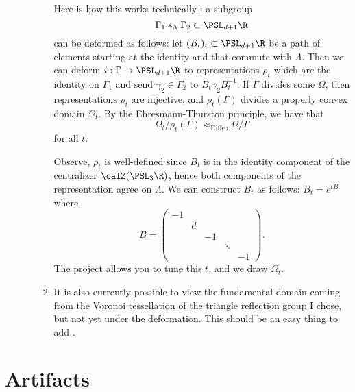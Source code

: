 \documentclass[12pt]{article}%
\begin{document}
\begin{enumerate}
\begin{enumerate}
\begin{enumerate}
			Here is how this works technically \cite{goldman}: a subgroup \[\Gamma_1 *_\Lambda \Gamma_2 \subset \PSL_{d + 1}\R\] can be deformed as follows: let $(B_t)_t \subset \PSL_{d + 1}\R$ be a path of elements starting at the identity and that commute with $\Lambda$. Then we can deform $i: \Gamma \to \PSL_{d + 1}\R$ to representations $\rho_t$ which are the identity on $\Gamma_1$ and send $\gamma_2 \in \Gamma_2$ to $B_t\gamma_2B_t^{-1}$. If $\Gamma$ divides some $\Omega$, then representations $\rho_t$ are injective, and $\rho_t(\Gamma)$ divides a properly convex domain $\Omega_t$. By the Ehresmann-Thurston principle, we have that \[\Omega_t/\rho_t(\Gamma) \approx_{\text{Diffeo}} \Omega/\Gamma\] for all $t$.

			Observe, $\rho_t$ is well-defined since $B_t$ is in the identity component of the centralizer $\calZ(\PSL_3\R)$, hence both components of the representation agree on $\Lambda$. We can construct $B_t$ as follows: $B_t = e^{tB}$ where \[B = \begin{pmatrix} -1 \\ &d \\ &&-1 \\ &&&\ddots \\ &&&&-1 \end{pmatrix}.\] The project allows you to tune this $t$, and we draw $\Omega_t$.
			\item It is also currently possible to view the fundamental domain coming from the Voronoi tessellation of the triangle reflection group I chose, but not yet under the deformation. This should be an easy thing to add \cite{gezalyan2021voronoi}.
		\end{enumerate}
	\end{enumerate}
\end{enumerate}

\section{Artifacts}



\end{document}
